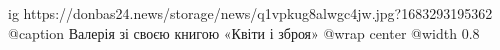  
 
 
 
 

\ifcmt
  ig https://donbas24.news/storage/news/q1vpkug8alwgc4jw.jpg?1683293195362
	@caption Валерія зі своєю книгою «Квіти і зброя»
  @wrap center
  @width 0.8
\fi
